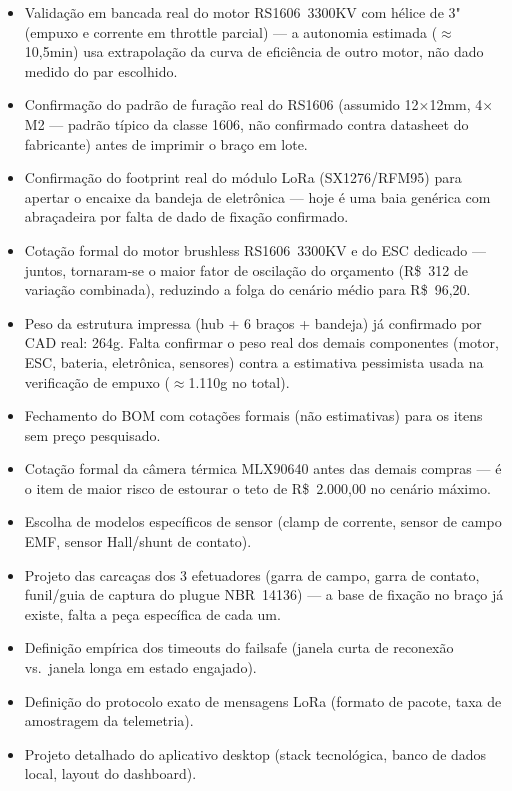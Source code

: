 \documentclass[11pt,a4paper]{article}
\begin{document}
\begin{itemize}[itemsep=3pt]
  \item Validação em bancada real do motor RS1606~3300KV com hélice de 3" (empuxo e corrente em throttle parcial) — a autonomia estimada ($\approx$10,5min) usa extrapolação da curva de eficiência de outro motor, não dado medido do par escolhido.
  \item Confirmação do padrão de furação real do RS1606 (assumido 12$\times$12mm, 4$\times$M2 — padrão típico da classe 1606, não confirmado contra datasheet do fabricante) antes de imprimir o braço em lote.
  \item Confirmação do footprint real do módulo LoRa (SX1276/RFM95) para apertar o encaixe da bandeja de eletrônica — hoje é uma baia genérica com abraçadeira por falta de dado de fixação confirmado.
  \item Cotação formal do motor brushless RS1606~3300KV e do ESC dedicado — juntos, tornaram-se o maior fator de oscilação do orçamento (R\$~312 de variação combinada), reduzindo a folga do cenário médio para R\$~96,20.
  \item Peso da estrutura impressa (hub + 6 braços + bandeja) já confirmado por CAD real: 264g. Falta confirmar o peso real dos demais componentes (motor, ESC, bateria, eletrônica, sensores) contra a estimativa pessimista usada na verificação de empuxo ($\approx$1.110g no total).
  \item Fechamento do BOM com cotações formais (não estimativas) para os itens sem preço pesquisado.
  \item Cotação formal da câmera térmica MLX90640 antes das demais compras — é o item de maior risco de estourar o teto de R\$~2.000,00 no cenário máximo.
  \item Escolha de modelos específicos de sensor (clamp de corrente, sensor de campo EMF, sensor Hall/shunt de contato).
  \item Projeto das carcaças dos 3 efetuadores (garra de campo, garra de contato, funil/guia de captura do plugue NBR~14136) — a base de fixação no braço já existe, falta a peça específica de cada um.
  \item Definição empírica dos timeouts do failsafe (janela curta de reconexão vs.\ janela longa em estado engajado).
  \item Definição do protocolo exato de mensagens LoRa (formato de pacote, taxa de amostragem da telemetria).
  \item Projeto detalhado do aplicativo desktop (stack tecnológica, banco de dados local, layout do dashboard).
\end{itemize}
\end{document}
